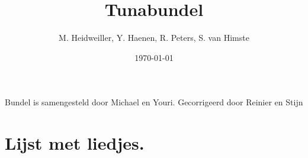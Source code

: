\documentclass[10pt,a4paper,twoside]{article}
\title{Tunabundel}
\author{M. Heidweiller,  Y. Haenen, R. Peters, S. van Himste}
\date{\today}
\begin{document}
\noindent




Bundel is samengesteld door Michael en Youri. Gecorrigeerd door Reinier en Stijn
\clearpage
\renewcommand\contentsname{Lijst met liedjes.}
\section*{\contentsname}
\twocolumntoc
\vfill
\clearpage

\raggedright
{}


{}
\end{document}

